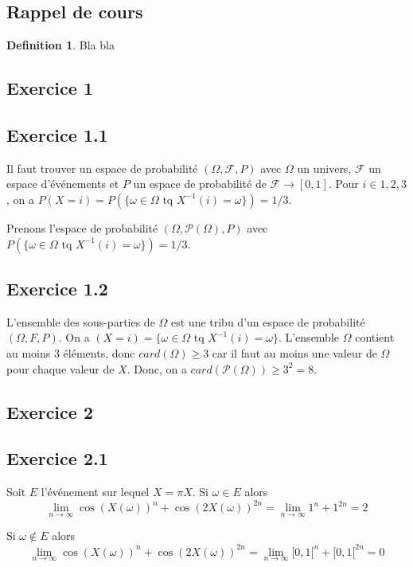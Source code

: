 \documentclass[]{book}
\theoremstyle{definition}
\newtheorem{defn}{Definition}
\begin{document}
\subsection*{Rappel de cours}
\begin{defn}
Bla bla
\end{defn}



\newpage
\subsection*{Exercice 1}
\subsection*{Exercice 1.1}
Il faut trouver un espace de probabilit\'e $(\Omega, \mathcal{F}, P)$ avec $\Omega$ un univers, $\mathcal{F}$ un espace d'\'ev\'enements et $P$ un espace de probabilit\'e de $\mathcal{F} \to [0,1]$.
Pour $i \in {1,2,3}$, on a $P(X=i) = P(\{\omega \in \Omega \text{ tq } X^{-1}(i) = \omega\}) = 1/3$.  

Prenons l'espace de probabilit\'e $(\Omega, \mathcal{P}(\Omega), P)$ avec $P(\{\omega \in \Omega \text{ tq } X^{-1}(i) = \omega\}) = 1/3$.


\subsection*{Exercice 1.2}
L'ensemble des sous-parties de $\Omega$ est une tribu d'un espace de probabilit\'e $(\Omega, F,P)$. On a $(X=i) = \{\omega \in \Omega \text{ tq } X^{-1}(i) = \omega\}$. L'ensemble $\Omega$ contient au moins 3 \'el\'ements, donc $card(\Omega) \geq 3$ car il faut au moins une valeur de $\Omega$ pour chaque valeur de $X$. Donc, on a $card(\mathcal{P}(\Omega)) \geq 3^2 = 8$.




\subsection*{Exercice 2}
\subsection*{Exercice 2.1}
Soit $E$ l'\'ev\'enement sur lequel $X=\pi X$. Si $\omega \in E$ alors 
$$
\lim_{n \to \infty}{\cos(X(\omega))^{n}+\cos(2X(\omega))^{2n}} = \lim_{n \to \infty}{1^n+1^{2n} = 2}
$$

Si $\omega \notin E$ alors 
$$
\lim_{n \to \infty}{\cos(X(\omega))^{n}+\cos(2X(\omega))^{2n}} = \lim_{n \to \infty}{[0,1[^n+[0,1[^{2n} = 0}
$$ 
\end{document}
